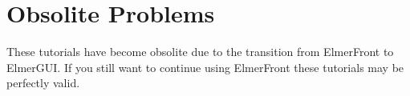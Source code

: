 \documentclass[a4paper,english]{report}    %
\begin{document}
\graphicspath{{./}{FlowStreamlines/}}


\graphicspath{{./}{Microfluidic/}}


\graphicspath{{./}{PassiveElements/}}



%

\part{Obsolite Problems}

These tutorials have become obsolite due to the transition from 
ElmerFront to ElmerGUI. If you still want to continue using ElmerFront these
tutorials may be perfectly valid.

\graphicspath{{./}{TemperatureAngle/}}


\graphicspath{{./}{ElasticBeam/}}


\graphicspath{{./}{FlowStepIncompressible/}}


\graphicspath{{./}{RayleighBenard/}}




\appendix

%


\printindex

\end{document}

